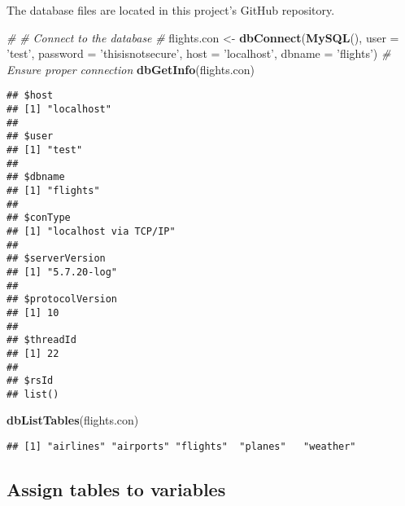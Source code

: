 \documentclass[]{article}
\newenvironment{Shaded}{\begin{snugshade}}{\end{snugshade}}
\newcommand{\KeywordTok}[1]{\textcolor[rgb]{0.13,0.29,0.53}{\textbf{#1}}}
\newcommand{\DataTypeTok}[1]{\textcolor[rgb]{0.13,0.29,0.53}{#1}}
\newcommand{\StringTok}[1]{\textcolor[rgb]{0.31,0.60,0.02}{#1}}
\newcommand{\CommentTok}[1]{\textcolor[rgb]{0.56,0.35,0.01}{\textit{#1}}}
\newcommand{\NormalTok}[1]{#1}
\begin{document}
The database files are located in this project's GitHub repository.

\begin{Shaded}
\begin{Highlighting}[]
\CommentTok{#}
\CommentTok{# Connect to the database}
\CommentTok{#}
\NormalTok{flights.con <-}\StringTok{ }\KeywordTok{dbConnect}\NormalTok{(}\KeywordTok{MySQL}\NormalTok{(),}
                         \DataTypeTok{user =} \StringTok{'test'}\NormalTok{,}
                         \DataTypeTok{password =} \StringTok{'thisisnotsecure'}\NormalTok{,}
                         \DataTypeTok{host =} \StringTok{'localhost'}\NormalTok{,}
                         \DataTypeTok{dbname =} \StringTok{'flights'}\NormalTok{)}
\CommentTok{# Ensure proper connection}
\KeywordTok{dbGetInfo}\NormalTok{(flights.con)}
\end{Highlighting}
\end{Shaded}

\begin{verbatim}
## $host
## [1] "localhost"
## 
## $user
## [1] "test"
## 
## $dbname
## [1] "flights"
## 
## $conType
## [1] "localhost via TCP/IP"
## 
## $serverVersion
## [1] "5.7.20-log"
## 
## $protocolVersion
## [1] 10
## 
## $threadId
## [1] 22
## 
## $rsId
## list()
\end{verbatim}

\begin{Shaded}
\begin{Highlighting}[]
\KeywordTok{dbListTables}\NormalTok{(flights.con)}
\end{Highlighting}
\end{Shaded}

\begin{verbatim}
## [1] "airlines" "airports" "flights"  "planes"   "weather"
\end{verbatim}

\subsection{Assign tables to
variables}\label{assign-tables-to-variables}
\end{document}
